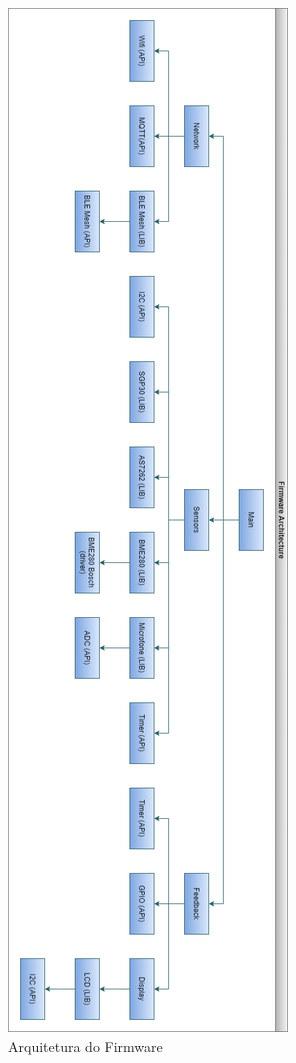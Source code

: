 \documentclass[../monografia.tex]{subfiles}
\begin{document}
\begin{figure}[h]
	\centering
	\includegraphics[height=.9\textheight]{fw-arch}
	\caption{Arquitetura do Firmware} %
	\label{fig:fw-arch}
\end{figure}
\end{document}
